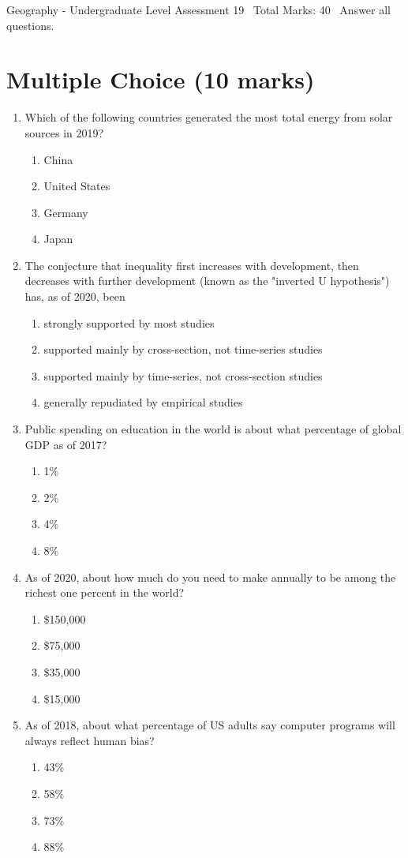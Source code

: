 \documentclass[12pt]{article}
\begin{document}
\begin{center}
Geography - Undergraduate Level Assessment 19 \
Total Marks: 40 \
Answer all questions.
\end{center}

\section*{Multiple Choice (10 marks)}
\begin{enumerate}[label=\arabic*.]
\item Which of the following countries generated the most total energy from solar sources in 2019?
\begin{enumerate}[label=(\alph*)]
    \item China
    \item United States
    \item Germany
    \item Japan
\end{enumerate}
\item The conjecture that inequality first increases with development, then decreases with further development (known as the "inverted U hypothesis") has, as of 2020, been
\begin{enumerate}[label=(\alph*)]
    \item strongly supported by most studies
    \item supported mainly by cross-section, not time-series studies
    \item supported mainly by time-series, not cross-section studies
    \item generally repudiated by empirical studies
\end{enumerate}
\item Public spending on education in the world is about what percentage of global GDP as of 2017?
\begin{enumerate}[label=(\alph*)]
    \item 1\%
    \item 2\%
    \item 4\%
    \item 8\%
\end{enumerate}
\item As of 2020, about how much do you need to make annually to be among the richest one percent in the world?
\begin{enumerate}[label=(\alph*)]
    \item \$150,000
    \item \$75,000
    \item \$35,000
    \item \$15,000
\end{enumerate}
\item As of 2018, about what percentage of US adults say computer programs will always reflect human bias?
\begin{enumerate}[label=(\alph*)]
    \item 43\%
    \item 58\%
    \item 73\%
    \item 88\%
\end{enumerate}
\end{enumerate}
\end{document}
